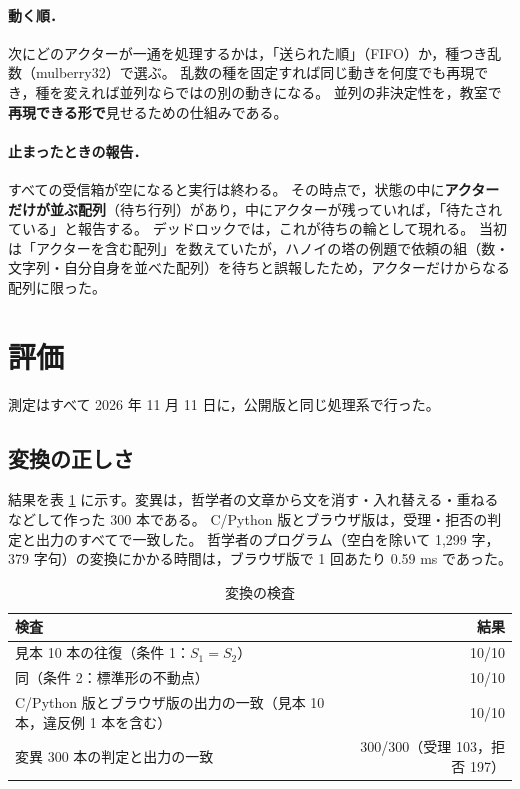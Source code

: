 \documentclass[a4paper,10pt]{ltjsarticle}
\begin{document}
\paragraph{動く順．}
次にどのアクターが一通を処理するかは，「送られた順」（FIFO）か，種つき乱数（mulberry32）で選ぶ。
乱数の種を固定すれば同じ動きを何度でも再現でき，種を変えれば並列ならではの別の動きになる。
並列の非決定性を，教室で\textbf{再現できる形で}見せるための仕組みである。

\paragraph{止まったときの報告．}
すべての受信箱が空になると実行は終わる。
その時点で，状態の中に\textbf{アクターだけが並ぶ配列}（待ち行列）があり，中にアクターが残っていれば，「待たされている」と報告する。
デッドロックでは，これが待ちの輪として現れる。
当初は「アクターを含む配列」を数えていたが，ハノイの塔の例題で依頼の組（数・文字列・自分自身を並べた配列）を待ちと誤報したため，アクターだけからなる配列に限った。

\section{評価}\label{sec:eval}

測定はすべて 2026 年 11 月 11 日に，公開版と同じ処理系で行った。

\subsection{変換の正しさ}

結果を表 \ref{tab:conv} に示す。変異は，哲学者の文章から文を消す・入れ替える・重ねるなどして作った 300 本である。
C/Python 版とブラウザ版は，受理・拒否の判定と出力のすべてで一致した。
哲学者のプログラム（空白を除いて 1{,}299 字，379 字句）の変換にかかる時間は，ブラウザ版で 1 回あたり 0.59 ms であった。

\begin{table}[t]
\centering\small
\caption{変換の検査}\label{tab:conv}
\begin{tabular}{@{}lr@{}}
\toprule
検査 & 結果 \\
\midrule
見本 10 本の往復（条件 1：$S_1=S_2$） & 10/10 \\
同（条件 2：標準形の不動点） & 10/10 \\
C/Python 版とブラウザ版の出力の一致（見本 10 本，違反例 1 本を含む） & 10/10 \\
変異 300 本の判定と出力の一致 & 300/300（受理 103，拒否 197）\\
\bottomrule
\end{tabular}
\end{table}
\end{document}
